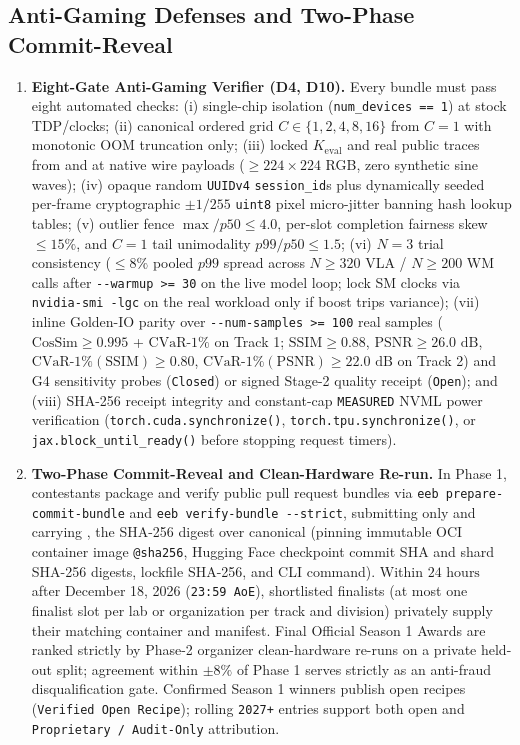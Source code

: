 \documentclass[10pt,letterpaper]{article}
\begin{document}
\subsection{Anti-Gaming Defenses and Two-Phase Commit-Reveal}
\begin{enumerate}
    \item \textbf{Eight-Gate Anti-Gaming Verifier (D4, D10).} Every bundle must pass eight automated checks: (i) single-chip isolation (\texttt{num\_devices == 1}) at stock TDP/clocks; (ii) canonical ordered grid $C \in \{1, 2, 4, 8, 16\}$ from $C = 1$ with monotonic OOM truncation only; (iii) locked $K_{\text{eval}}$ and real public traces from  and  at native wire payloads ($\ge 224\times 224$ RGB, zero synthetic sine waves); (iv) opaque random \texttt{UUIDv4} \texttt{session\_id}s plus dynamically seeded per-frame cryptographic $\pm 1/255$ \texttt{uint8} pixel micro-jitter banning hash lookup tables; (v) outlier fence $\max / p50 \le 4.0$, per-slot completion fairness skew $\le 15\%$, and $C{=}1$ tail unimodality $p99 / p50 \le 1.5$; (vi) $N = 3$ trial consistency ($\le 8\%$ pooled $p99$ spread across $N \ge 320$ VLA / $N \ge 200$ WM calls after \texttt{-{}-warmup >= 30} on the live model loop; lock SM clocks via \texttt{nvidia-smi -lgc} on the real workload only if boost trips variance); (vii) inline Golden-IO parity over \texttt{-{}-num-samples >= 100} real samples ($\text{CosSim} \ge 0.995$ + $\text{CVaR-1\%}$ on Track 1; $\text{SSIM} \ge 0.88$, $\text{PSNR} \ge 26.0\text{ dB}$, $\text{CVaR-1\%}(\text{SSIM}) \ge 0.80$, $\text{CVaR-1\%}(\text{PSNR}) \ge 22.0\text{ dB}$ on Track 2) and $\text{G4}$ sensitivity probes (\texttt{Closed}) or signed Stage-2 quality receipt (\texttt{Open}); and (viii) SHA-256 receipt integrity and constant-cap \texttt{MEASURED} NVML power verification (\texttt{torch.cuda.synchronize()}, \texttt{torch.tpu.synchronize()}, or \texttt{jax.block\_until\_ready()} before stopping request timers).
    \item \textbf{Two-Phase Commit-Reveal and Clean-Hardware Re-run.} In Phase 1, contestants package and verify public pull request bundles via \texttt{eeb prepare-commit-bundle} and \texttt{eeb verify-bundle -{}-strict}, submitting only  and  carrying , the SHA-256 digest over canonical  (pinning immutable OCI container image \texttt{@sha256}, Hugging Face checkpoint commit SHA and shard SHA-256 digests, lockfile SHA-256, and CLI command). Within $24\text{ hours}$ after December 18, 2026 (\texttt{23:59 AoE}), shortlisted finalists (at most one finalist slot per lab or organization per track and division) privately supply their matching container and manifest. Final Official Season 1 Awards are ranked strictly by Phase-2 organizer clean-hardware re-runs on a private held-out split; agreement within $\pm 8\%$ of Phase 1 serves strictly as an anti-fraud disqualification gate. Confirmed Season 1 winners publish open recipes (\texttt{Verified Open Recipe}); rolling \texttt{2027+} entries support both open and \texttt{Proprietary / Audit-Only} attribution.
\end{enumerate}
\end{document}
